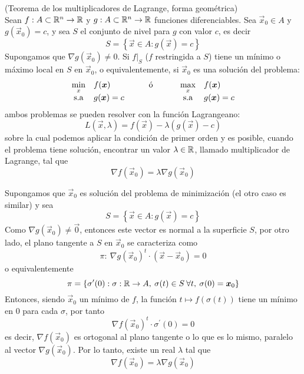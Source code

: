 \begin{teorema}{\rm (Teorema de los multiplicadores de Lagrange, forma geom\'etrica)}
\\Sean $f:A\subset\R^{n}\rightarrow\R$ y
$g:A\subset\R^{n}\rightarrow\R$ funciones diferenciables. Sea $\vec{x}_{0}\in
A$ y $g(\vec{x}_{0})=c$, y sea $S$ el conjunto de nivel para $g$ con valor $c$, es
decir
\[
S=\left\{\vec{x}\in A : g(\vec{x})=c\right\}
\]
Supongamos que $\nabla g(\vec{x}_{0})\neq 0$. Si $\left.  f\right|  _{S}$ ($f$
restringida a $S$) tiene un m\'inimo o m\'aximo local en $S$ en $\vec{x}_{0}$, o
equivalentemente, si $\vec{x}_{0}$ es una soluci\'on del problema:
\begin{equation*}
\begin{array}{clccl}
\displaystyle \min_x 		& f(\vec{x}) 	 & \text{\qquad \'o \qquad} & \displaystyle \max_x 	 & f(\vec{x})\\
\text{s.a}					& g(\vec{x})=c &  						& \text{s.a} 			 & g(\vec{x})=c
\end{array}
\end{equation*}
ambos problemas se pueden resolver con la funci\'on Lagrangeano:
$$L(\vec{x},\lambda) = f(\vec{x}) - \lambda (g(\vec{x})-c)$$
sobre la cual podemos aplicar la condici\'on de primer orden y es posible, cuando el problema tiene soluci\'on, encontrar un valor
$\lambda \in \R$, llamado multiplicador de Lagrange, tal que
\[
\nabla f(\vec{x}_{0})=\lambda\nabla g(\vec{x}_{0})
\]
\end{teorema}

\begin{demostracion}
Supongamos que $\vec{x}_{0}$ es soluci\'on del problema de minimizaci\'on (el
otro caso es similar) y sea
\[
S=\left\{ \vec{x}\in A: g(\vec{x})=c\right\}
\]
Como $\nabla g(\vec{x}_{0})\neq \vec{0}$, entonces este vector es normal a la superficie
$S$, por otro lado, el plano tangente a $S$ en $\vec{x}_{0}$ se caracteriza como
\[
\pi:\:\nabla g(\vec{x}_{0})^t\cdot(\vec{x}-\vec{x}_{0})=0
\]
o equivalentemente
\[
\pi=\left\{  \sigma^{\prime}(0):\sigma:\R\to A,\:\sigma(t)\in
S\:\forall t,\:\sigma(0)=\vec{x}_{0}\right\}
\]
Entonces, siendo $\vec{x}_{0}$ un m\'inimo de $f$, la funci\'on $t\longmapsto
f(\sigma(t))$ tiene un m\'inimo en $0$ para cada $\sigma$, por tanto
\[
\nabla f(\vec{x}_{0})^t\cdot\sigma^{\prime}(0)=0
\]
es decir, $\nabla f(\vec{x}_{0})$ es ortogonal al plano tangente o lo que es lo
mismo, paralelo al vector $\nabla g(\vec{x}_{0})$. Por lo tanto, existe un real
$\lambda$ tal que
\[\nabla f(\vec{x}_{0})=\lambda\nabla g(\vec{x}_{0})\]
\end{demostracion}

